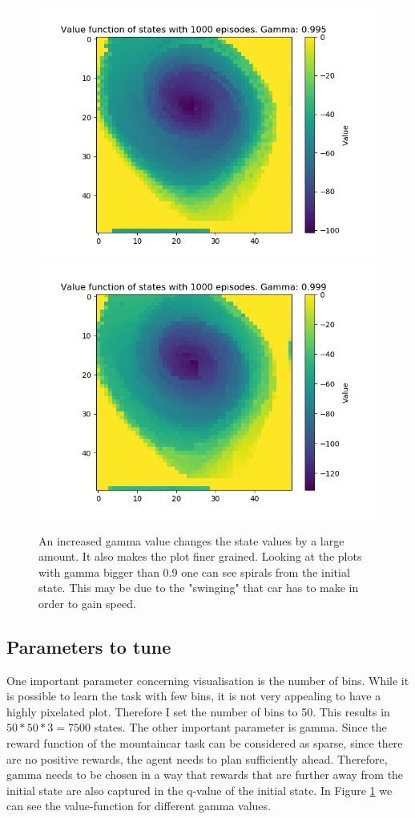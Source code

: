\documentclass[a4paper]{article}
\begin{document}
\begin{figure}
%
  \includegraphics[width=\linewidth]{"gamma 0995"}
\endminipage
{}%
  \includegraphics[width=\linewidth]{"gamma 0999"}
\endminipage
\caption{An increased gamma value changes the state values by a large amount. It also makes the plot finer grained. Looking at the plots with gamma bigger than 0.9 one can see spirals from the initial state. This may be due to the "swinging" that car has to make in order to gain speed.}
\label{fig:gamma}
\end{figure}

\subsection{Parameters to tune}
One important parameter concerning visualisation is the number of bins. While it is possible to learn the task with few bins, it is not very appealing to have a highly pixelated plot. Therefore I set the number of bins to 50. This results in $50*50*3 = 7500$ states.
The other important parameter is gamma. Since the reward function of the mountaincar task can be considered as sparse, since there are no positive rewards, the agent needs to plan sufficiently ahead. Therefore, gamma needs to be chosen in a way that rewards that are further away from the initial state are also captured in the q-value of the initial state. In Figure \ref{fig:gamma} we can see the value-function for different gamma values.
\end{document}
